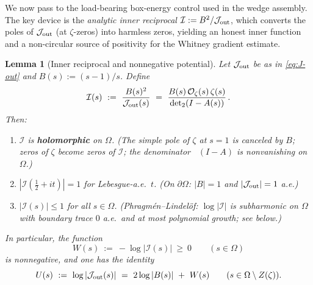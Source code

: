 \documentclass[11pt]{amsart}
\newtheorem{lemma}[theorem]{Lemma}
\theoremstyle{definition}
\theoremstyle{remark}
\DeclareMathOperator{\dettwo}{det_2}
\begin{document}
We now pass to the load-bearing box-energy control used in the wedge assembly.
The key device is the \emph{analytic inner reciprocal} \(\mathcal I:=B^2/\mathcal J_{\rm out}\),
which converts the poles of \(\mathcal J_{\rm out}\) (at \(\zeta\)-zeros) into
harmless zeros, yielding an honest inner function and a non-circular source of
positivity for the Whitney gradient estimate.

\begin{lemma}[Inner reciprocal and nonnegative potential]\label{lem:inner-reciprocal}
Let \(\mathcal J_{\rm out}\) be as in \eqref{eq:J-out} and \(B(s):=(s-1)/s\).
Define
\[
  \mathcal I(s)\ :=\ \frac{B(s)^2}{\mathcal J_{\rm out}(s)}
  \ =\ \frac{B(s)\,\mathcal O_\zeta(s)\,\zeta(s)}{\dettwo(I-A(s))}\,.
\]
Then:
\begin{enumerate}
\item \(\mathcal I\) is \textbf{holomorphic} on \(\Omega\).
  (The simple pole of \(\zeta\) at \(s=1\) is canceled by \(B\);
   zeros of \(\zeta\) become zeros of \(\mathcal I\);
   the denominator \(\dettwo(I-A)\) is nonvanishing on \(\Omega\).)
\item \(|\mathcal I(\tfrac12+it)|=1\) for Lebesgue-a.e.\ \(t\).
  (On \(\partial\Omega\): \(|B|=1\) and \(|\mathcal J_{\rm out}|=1\) a.e.)
\item \(|\mathcal I(s)|\le 1\) for all \(s\in\Omega\).
  (Phragmén--Lindelöf: \(\log|\mathcal I|\) is subharmonic on \(\Omega\)
   with boundary trace \(0\) a.e.\ and at most polynomial growth;
   see below.)
\end{enumerate}
In particular, the function
\[
  W(s)\ :=\ -\log|\mathcal I(s)|\ \ge\ 0 \qquad(s\in\Omega)
\]
is nonnegative, and one has the identity
\[
  U(s)\ :=\ \log|\mathcal J_{\rm out}(s)|\ =\ 2\log|B(s)|\ +\ W(s)
  \qquad(s\in\Omega\setminus Z(\zeta)).
\]
\end{lemma}
\end{document}
